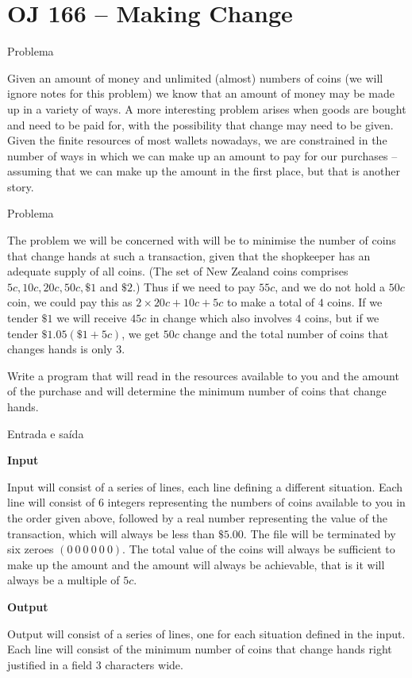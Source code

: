\section{OJ 166 -- Making Change}

\begin{frame}[fragile]{Problema}

Given an amount of money and unlimited (almost) numbers of coins (we will ignore notes for this
problem) we know that an amount of money may be made up in a variety of ways. A more interesting
problem arises when goods are bought and need to be paid for, with the possibility that change may
need to be given. Given the finite resources of most wallets nowadays, we are constrained in the number
of ways in which we can make up an amount to pay for our purchases -- assuming that we can make
up the amount in the first place, but that is another story.

\end{frame}

\begin{frame}[fragile]{Problema}

The problem we will be concerned with will be to minimise the number of coins that change hands
at such a transaction, given that the shopkeeper has an adequate supply of all coins. (The set of
New Zealand coins comprises $5c, 10c, 20c, 50c, \$1$ and $\$2$.) Thus if we need to pay $55c$, and
we do not hold a $50c$ coin, we could pay this as $2\times 20c + 10c + 5c$ to make a total of $4$
coins. If we tender $\$1$ we will receive $45c$ in change which also involves $4$ coins, but if we
tender $\$1.05 (\$1 + 5c)$, we get $50c$ change and the total number of coins that changes hands is
only $3$.

Write a program that will read in the resources available to you and the amount of the purchase
and will determine the minimum number of coins that change hands.

\end{frame}

\begin{frame}[fragile]{Entrada e saída}

\textbf{Input}

Input will consist of a series of lines, each line defining a different situation. Each line will
consist of $6$ integers representing the numbers of coins available to you in the order given
above, followed by a real number representing the value of the transaction, which will always be
less than $\$5.00$. The file will be terminated by six zeroes $(0\ 0\ 0\ 0\ 0\ 0)$. The total value
of the coins will always be sufficient to make up the amount and the amount will always be
achievable, that is it will always be a multiple of $5c$.

\textbf{Output}

Output will consist of a series of lines, one for each situation defined in the input. Each line
will consist of the minimum number of coins that change hands right justified in a field $3$
characters wide.

\end{frame}

